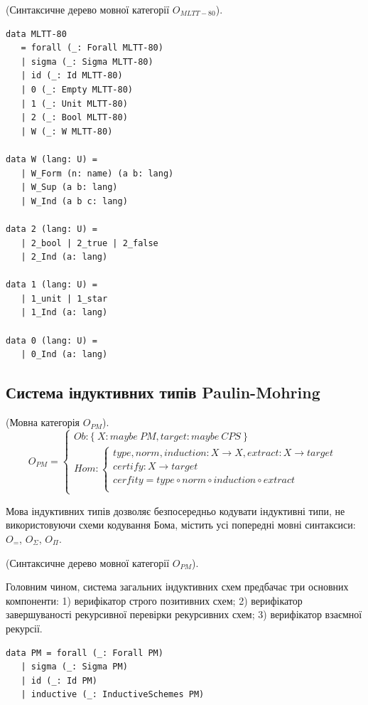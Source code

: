 \begin{definition} (Синтаксичне дерево мовної категорії $O_{MLTT-80}$).
\begin{lstlisting}
data MLTT-80
   = forall (_: Forall MLTT-80)
   | sigma (_: Sigma MLTT-80)
   | id (_: Id MLTT-80)
   | 0 (_: Empty MLTT-80)
   | 1 (_: Unit MLTT-80)
   | 2 (_: Bool MLTT-80)
   | W (_: W MLTT-80)

data W (lang: U) =
   | W_Form (n: name) (a b: lang)
   | W_Sup (a b: lang)
   | W_Ind (a b c: lang)

data 2 (lang: U) =
   | 2_bool | 2_true | 2_false
   | 2_Ind (a: lang)

data 1 (lang: U) =
   | 1_unit | 1_star
   | 1_Ind (a: lang)

data 0 (lang: U) =
   | 0_Ind (a: lang)

\end{lstlisting}
\end{definition}

\newpage
\subsection{Система індуктивних типів Paulin-Mohring}

\begin{definition} (Мовна категорія $O_{PM}$).
\begin{equation}
O_{PM} =
\begin{cases}
Ob: \{\ X: maybe\ PM, target: maybe\ CPS\ \} \\
Hom: \begin{cases}
type,norm,induction: X \rightarrow X, extract: X \rightarrow target \\
certify : X \rightarrow target \\
cerfity = type \circ norm \circ induction \circ extract \\
\end{cases}
\end{cases}
\end{equation}
\end{definition}

Мова індуктивних типів дозволяє безпосередньо кодувати індуктивні типи,
не використовуючи схеми кодування Бома, містить усі попередні мовні синтаксиси:
$O_=$, $O_\Sigma$, $O_\Pi$.

\begin{definition} (Синтаксичне дерево мовної категорії $O_{PM}$).

Головним чином, система загальних індуктивних схем предбачає три основних компоненти:
1) верифікатор строго позитивних схем;
2) верифікатор завершуваності рекурсивної перевірки рекурсивних схем;
3) верифікатор взаємної рекурсії.

\begin{lstlisting}
data PM = forall (_: Forall PM)
   | sigma (_: Sigma PM)
   | id (_: Id PM)
   | inductive (_: InductiveSchemes PM)
\end{lstlisting}
\end{definition}

